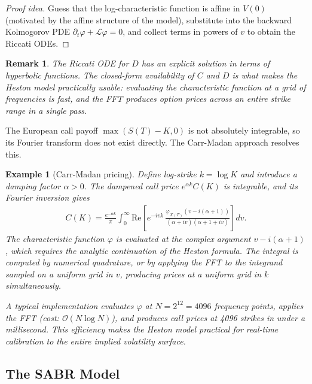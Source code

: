 \documentclass{report}
\theoremstyle{spacedplain}
\theoremstyle{spaceddefinition}
\newtheorem{example}[theorem]{Example}
\theoremstyle{spacedremark}
\newtheorem{remark}[theorem]{Remark}
\begin{document}
\begin{proof}[Proof idea]
Guess that the log-characteristic function is affine in $V(0)$ (motivated by the affine structure of the model), substitute into the backward Kolmogorov PDE $\partial_t \varphi + \mathcal{L}\varphi = 0$, and collect terms in powers of $v$ to obtain the Riccati ODEs.
\end{proof}

\begin{remark}
The Riccati ODE for $D$ has an explicit solution in terms of hyperbolic functions. The closed-form availability of $C$ and $D$ is what makes the Heston model practically usable: evaluating the characteristic function at a grid of frequencies is fast, and the FFT produces option prices across an entire strike range in a single pass.
\end{remark}

The European call payoff $\max(S(T)-K, 0)$ is not absolutely integrable, so its Fourier transform does not exist directly. The Carr-Madan approach resolves this.

\begin{example}[Carr-Madan pricing]
Define log-strike $k = \log K$ and introduce a damping factor $\alpha > 0$. The dampened call price $e^{\alpha k}C(K)$ is integrable, and its Fourier inversion gives
\begin{align}
    C(K) = \frac{e^{-\alpha k}}{\pi}\int_0^{\infty} \text{Re}\!\left[e^{-ivk}\,\frac{\varphi_{X(T)}(v - i(\alpha+1))}{(\alpha + iv)(\alpha + 1 + iv)}\right]dv.
\end{align}
The characteristic function $\varphi$ is evaluated at the complex argument $v - i(\alpha+1)$, which requires the analytic continuation of the Heston formula. The integral is computed by numerical quadrature, or by applying the FFT to the integrand sampled on a uniform grid in $v$, producing prices at a uniform grid in $k$ simultaneously.

A typical implementation evaluates $\varphi$ at $N = 2^{12} = 4096$ frequency points, applies the FFT (cost: $\mathcal{O}(N\log N)$), and produces call prices at 4096 strikes in under a millisecond. This efficiency makes the Heston model practical for real-time calibration to the entire implied volatility surface.
\end{example}


\subsection{The SABR Model}
\end{document}
